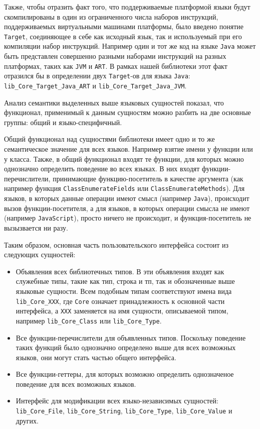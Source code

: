 Также, чтобы отразить факт того, что поддерживаемые платформой языки будут скомпилированы в один из ограниченного числа наборов инструкций, поддерживаемых виртуальными машинами платформы, было введено понятие \texttt{Target}, соединяющее в себе как исходный язык, так и используемый при его компиляции набор инструкций. Например один и тот же код на языке \texttt{Java} может быть представлен совершенно разными наборами инструкций на разных платформах, таких как \texttt{JVM} и \texttt{ART}. В рамках нашей библиотеки этот факт отразился бы в определении двух \texttt{Target}-ов для языка \texttt{Java}: \texttt{lib\_Core\_Target\_Java\_ART} и \texttt{lib\_Core\_Target\_Java\_JVM}.

Анализ семантики выделенных выше языковых сущностей показал, что функционал, применимый к данным сущностям можно разбить на две основные группы: общий и языко-специфичный.

Общий функционал над сущностями библиотеки имеет одно и то же семантическое значение для всех языков. Например взятие имени у функции или у класса. Также, в общий функционал входят те функции, для которых можно однозначно определить поведение во всех языках. В них входят функции-перечислители, принимающие функцию-посетитель в качестве аргумента (как например функция \texttt{ClassEnumerateFields} или \texttt{ClassEnumerateMethods}). Для языков, в которых данные операции имеют смысл (например \texttt{Java}), происходит вызов функции-посетителя, а для языков, в которых операции смысла не имеют (например \texttt{JavaScript}), просто ничего не происходит, и функция-посетитель не вызызвается ни разу.

Таким образом, основная часть пользовательского интерфейса состоит из следующих сущностей:

\begin{itemize}
    \item Объявления всех библиотечных типов. В эти объявления входят как служебные типы, такие как тип, строка и тп, так и обозначенные выше языковые сущности. Всем подобным типам соответствуют имена вида \texttt{lib\_Core\_XXX}, где \texttt{Core} означает принадлежность к основной части интерфейса, а \texttt{XXX} заменяется на имя сущности, описываемой типом, например \texttt{lib\_Core\_Class} или \texttt{lib\_Core\_Type}.
    \item Все функции-перечислители для объявленных типов. Поскольку поведение таких функций было однозначно определено выше для всех возможных языков, они могут стать частью общего интерфейса.
    \item Все функции-геттеры, для которых возможно определить однозначеное поведение для всех возможных языков.
    \item Интерфейс для модификации всех языко-независимых сущностей: \texttt{lib\_Core\_File}, \texttt{lib\_Core\_String}, \texttt{lib\_Core\_Type}, \texttt{lib\_Core\_Value} и других.
\end{itemize}

